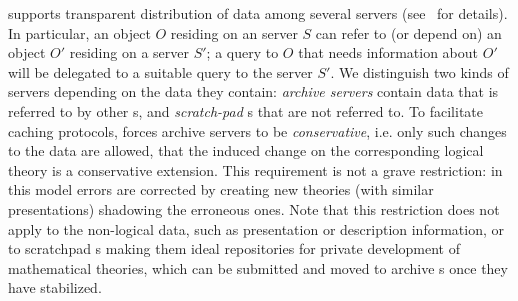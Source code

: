 {\mbase} supports transparent distribution of data among several {\mbase} servers
(see~\cite{KohFra:rkcimss00} for details). In particular, an object $O$ residing
on an {\mbase} server $S$ can refer to (or depend on) an object $O'$ residing on a
server $S'$; a query to $O$ that needs information about $O'$ will be delegated to
a suitable query to the server $S'$.  We distinguish two kinds of {\mbase} servers
depending on the data they contain: {\em archive servers\/} contain data that is
referred to by other {\mbase}s, and {\em scratch-pad\/} {\mbase}s that are not
referred to. To facilitate caching protocols, {\mbase} forces archive servers to
be {\em conservative}, i.e. only such changes to the data are allowed, that the
induced change on the corresponding logical theory is a conservative extension.
This requirement is not a grave restriction: in this model errors are corrected by
creating new theories (with similar presentations) shadowing the erroneous ones.
Note that this restriction does not apply to the non-logical data, such as
presentation or description information, or to scratchpad {\mbase}s making them
ideal repositories for private development of mathematical theories, which can be
submitted and moved to archive {\mbase}s once they have stabilized.

